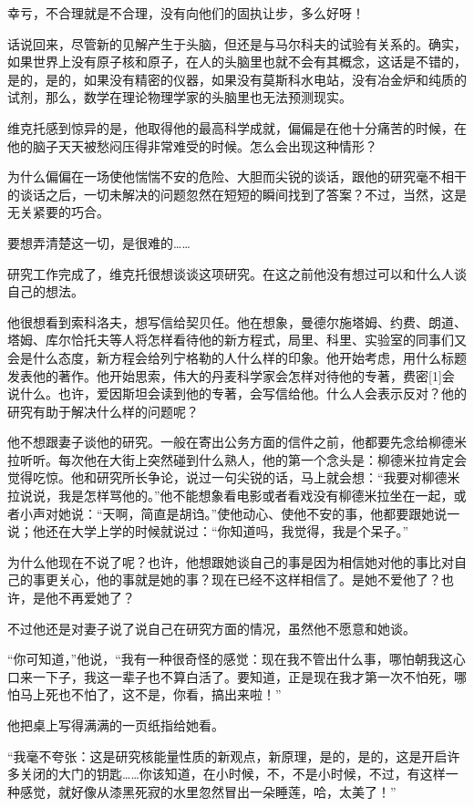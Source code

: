幸亏，不合理就是不合理，没有向他们的固执让步，多么好呀！

话说回来，尽管新的见解产生于头脑，但还是与马尔科夫的试验有关系的。确实，如果世界上没有原子核和原子，在人的头脑里也就不会有其概念，这话是不错的，是的，是的，如果没有精密的仪器，如果没有莫斯科水电站，没有冶金炉和纯质的试剂，那么，数学在理论物理学家的头脑里也无法预测现实。

维克托感到惊异的是，他取得他的最高科学成就，偏偏是在他十分痛苦的时候，在他的脑子天天被愁闷压得非常难受的时候。怎么会出现这种情形？

为什么偏偏在一场使他惴惴不安的危险、大胆而尖锐的谈话，跟他的研究毫不相干的谈话之后，一切未解决的问题忽然在短短的瞬间找到了答案？不过，当然，这是无关紧要的巧合。

要想弄清楚这一切，是很难的……

研究工作完成了，维克托很想谈谈这项研究。在这之前他没有想过可以和什么人谈自己的想法。

他很想看到索科洛夫，想写信给契贝任。他在想象，曼德尔施塔姆、约费、朗道、塔姆、库尔恰托夫等人将怎样看待他的新方程式，局里、科里、实验室的同事们又会是什么态度，新方程会给列宁格勒的人什么样的印象。他开始考虑，用什么标题发表他的著作。他开始思索，伟大的丹麦科学家会怎样对待他的专著，费密[1]会说什么。也许，爱因斯坦会读到他的专著，会写信给他。什么人会表示反对？他的研究有助于解决什么样的问题呢？

他不想跟妻子谈他的研究。一般在寄出公务方面的信件之前，他都要先念给柳德米拉听听。每次他在大街上突然碰到什么熟人，他的第一个念头是：柳德米拉肯定会觉得吃惊。他和研究所长争论，说过一句尖锐的话，马上就会想：“我要对柳德米拉说说，我是怎样骂他的。”他不能想象看电影或者看戏没有柳德米拉坐在一起，或者小声对她说：“天啊，简直是胡诌。”使他动心、使他不安的事，他都要跟她说一说；他还在大学上学的时候就说过：“你知道吗，我觉得，我是个呆子。”

为什么他现在不说了呢？也许，他想跟她谈自己的事是因为相信她对他的事比对自己的事更关心，他的事就是她的事？现在已经不这样相信了。是她不爱他了？也许，是他不再爱她了？

不过他还是对妻子说了说自己在研究方面的情况，虽然他不愿意和她谈。

“你可知道，”他说，“我有一种很奇怪的感觉：现在我不管出什么事，哪怕朝我这心口来一下子，我这一辈子也不算白活了。要知道，正是现在我才第一次不怕死，哪怕马上死也不怕了，这不是，你看，搞出来啦！”

他把桌上写得满满的一页纸指给她看。

“我毫不夸张：这是研究核能量性质的新观点，新原理，是的，是的，这是开启许多关闭的大门的钥匙……你该知道，在小时候，不，不是小时候，不过，有这样一种感觉，就好像从漆黑死寂的水里忽然冒出一朵睡莲，哈，太美了！”


